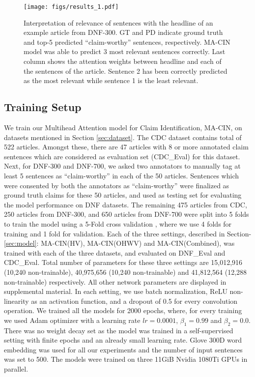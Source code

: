 \documentclass[11pt,a4paper]{article}
\begin{document}
\begin{figure*}[ht]
\begin{center}
\texttt{[image: figs/results\_1.pdf]}
\caption{\label{fig:hd_sent} Interpretation of relevance of sentences with the headline of an example article from DNF-300. GT and PD indicate ground truth and top-5 predicted ``claim-worthy'' sentences, respectively. MA-CIN model was able to predict 3 most relevant sentences correctly. Last column shows the attention weights between headline and each of the sentences of the article. Sentence 2 has been correctly predicted as the most relevant while sentence 1 is the least relevant.}
\end{center}
\end{figure*}

\subsection{Training Setup}
\label{sect:exp_training}
We train our Multihead Attention model for Claim Identification, MA-CIN, on datasets mentioned in Section \ref{sec:dataset}. The CDC dataset contains total of 522 articles. Amongst these, there are 47 articles with 8 or more annotated claim sentences which are considered as evaluation set (CDC\_Eval) for this dataset. Next, for DNF-300 and DNF-700, we asked two annotators to manually tag at least 5 sentences as ``claim-worthy'' in each of the 50 articles. Sentences which were consented by both the annotators as ``claim-worthy'' were finalized as ground truth claims for these 50 articles, and used as testing set for evaluating the model performance on DNF datasets. The remaining 475 articles from CDC, 250 articles from DNF-300, and 650 articles from DNF-700 were split into 5 folds to train the model using a 5-Fold cross validation \cite{Kohavi:1995:SCB:1643031.1643047}, where we use 4 folds for training and 1 fold for validation. Each of the three settings, described in Section- \ref{sec:model}: MA-CIN(HV), MA-CIN(OHWV) and MA-CIN(Combined), was trained with each of the three datasets, and evaluated on DNF\_Eval and CDC\_Eval. Total number of parameters for these three settings are 15,012,916 (10,240 non-trainable), 40,975,656 (10,240 non-trainable) and 41,812,564 (12,288 non-trainable) respectively. All other network parameters are displayed in supplemental material.\newline
\indent In each setting, we use batch normalization, ReLU non-linearity as an activation function, and a dropout of 0.5 for every convolution operation. We trained all the models for 2000 epochs, where, for every training we used Adam optimizer with a learning rate $lr=0.0001$, $\beta_{1}=0.99$ and $\beta_{2}=0.0$. There was no weight decay set as the model was trained in a self-supervised setting with finite epochs and an already small learning rate. Glove 300D word embedding was used for all our experiments and the number of input sentences was set to 500. The models were trained on three 11GiB Nvidia 1080Ti GPUs in parallel.
\end{document}
